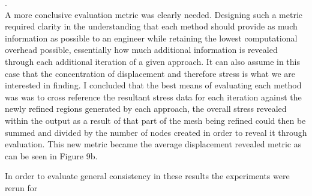 \cite{ElemQualAndChecks}. \\


\noindent
A more conclusive evaluation metric was clearly needed. Designing such a metric required clarity in the understanding that each method should provide as much information as possible to an engineer while retaining the lowest computational overhead possible, essentially how much additional information is revealed through each additional iteration of a given approach. It can also assume in this case that the concentration of displacement and therefore stress is what we are interested in finding. I concluded that the best means of evaluating each method was was to cross reference the resultant stress data for each iteration against the newly refined regions generated by each approach, the overall stress revealed within the output as a result of that part of the mesh being refined could then be summed and divided by the number of nodes created in order to reveal it through evaluation. This new metric became the average displacement revealed metric as can be seen in Figure 9b. \\ 





\noindent






In order to evaluate general consistency in these results the experiments were rerun for 


